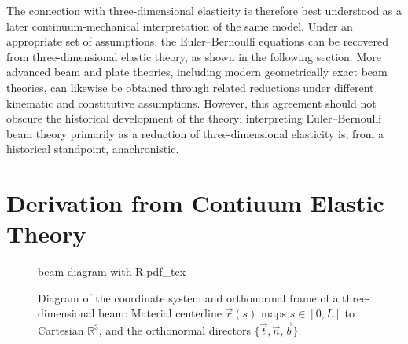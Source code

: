 The connection with three-dimensional elasticity is therefore best understood
as a later continuum-mechanical interpretation of the same model. Under an
appropriate set of assumptions, the Euler--Bernoulli equations can be recovered
from three-dimensional elastic theory, as shown in the following section. More
advanced beam and plate theories, including modern geometrically exact beam
theories, can likewise be obtained through related reductions under different
kinematic and constitutive assumptions. However, this agreement should not
obscure the historical development of the theory: interpreting Euler--Bernoulli
beam theory primarily as a reduction of three-dimensional elasticity is, from a
historical standpoint, anachronistic.

\section{Derivation from Contiuum Elastic Theory}
\label{sec:derivation-from-continumm-elastic-theory}

\begin{figure}[t]
	\centering
	\def\svgwidth{\textwidth}
	{beam-diagram-with-R.pdf_tex}
	\caption{Diagram of the coordinate system and orthonormal frame of a three-dimensional beam: Material centerline \(\vec r(s)\) maps \(s \in [0,L]\) to Cartesian \(\mathbb{R}^3\), and the orthonormal directors \(\{\vec t, \vec n, \vec b\}\).}
	\label{fig:coordinate-system}
\end{figure}


